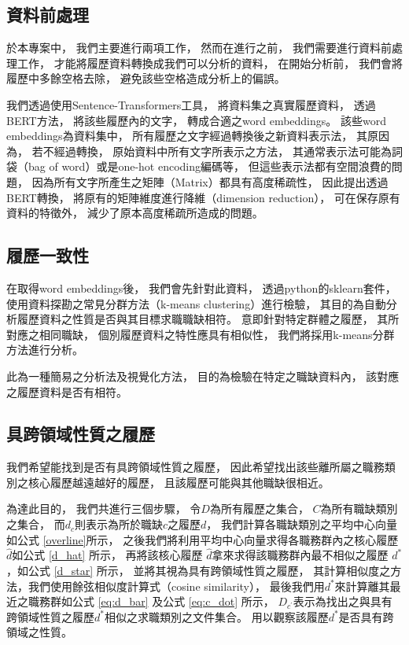 \documentclass[sigconf]{acmart}
\begin{document}
\subsection{資料前處理}

於本專案中，
我們主要進行兩項工作，
然而在進行之前，
我們需要進行資料前處理工作，
才能將履歷資料轉換成我們可以分析的資料，
在開始分析前，
我們會將履歷中多餘空格去除，
避免該些空格造成分析上的偏誤。

我們透過使用Sentence-Transformers\cite{reimers-2020-multilingual-sentence-bert}工具，
將資料集之真實履歷資料，
透過BERT方法\cite{devlin2018bert}，
將該些履歷內的文字，
轉成合適之word embeddings。
該些word embeddings為資料集中，
所有履歷之文字經過轉換後之新資料表示法，
其原因為，
若不經過轉換，
原始資料中所有文字所表示之方法，
其通常表示法可能為詞袋（bag of word）或是one-hot encoding編碼等，
但這些表示法都有空間浪費的問題，
因為所有文字所產生之矩陣（Matrix）都具有高度稀疏性\cite{schutze2008introduction}，
因此提出透過BERT轉換\cite{devlin2018bert}，
將原有的矩陣維度進行降維（dimension reduction），
可在保存原有資料的特徵外，
減少了原本高度稀疏所造成的問題。

\subsection{履歷一致性}

在取得word embeddings後，
我們會先針對此資料，
透過python的sklearn\cite{sklearn_api}套件，
使用資料探勘之常見分群方法（k-means clustering）進行檢驗\cite{han2011data}，
其目的為自動分析履歷資料之性質是否與其目標求職職缺相符。
意即針對特定群體之履歷，
其所對應之相同職缺，
個別履歷資料之特性應具有相似性，
我們將採用k-means分群方法\cite{macqueen1967some}進行分析。

此為一種簡易之分析法及視覺化方法，
目的為檢驗在特定之職缺資料內，
該對應之履歷資料是否有相符。


\subsection{具跨領域性質之履歷}

我們希望能找到是否有具跨領域性質之履歷，
因此希望找出該些離所屬之職務類別之核心履歷越遠越好的履歷，
且該履歷可能與其他職缺很相近。

為達此目的，
我們共進行三個步驟，
令$D$為所有履歷之集合，
$C$為所有職缺類別之集合，
而$d_{c}$則表示為所於職缺$c$之履歷$d$，
我們計算各職缺類別之平均中心向量如公式 \ref{overline}所示，
之後我們將利用平均中心向量求得各職務群內之核心履歷$\hat{d}$如公式 \ref{d_hat} 所示，
再將該核心履歷 $\hat{d}$拿來求得該職務群內最不相似之履歷 $d^{*}$，如公式 \ref{d_star} 所示，
並將其視為具有跨領域性質之履歷，
其計算相似度之方法，我們使用餘弦相似度計算式（cosine similarity）\cite{schutze2008introduction}，
最後我們用$d^{*}$來計算離其最近之職務群如公式 \ref{eq:d_bar} 及公式 \ref{eq:c_dot} 所示，
$D_{c^{'}}$表示為找出之與具有跨領域性質之履歷$d^{*}$相似之求職類別之文件集合。
用以觀察該履歷$d^{*}$是否具有跨領域之性質。
\end{document}
